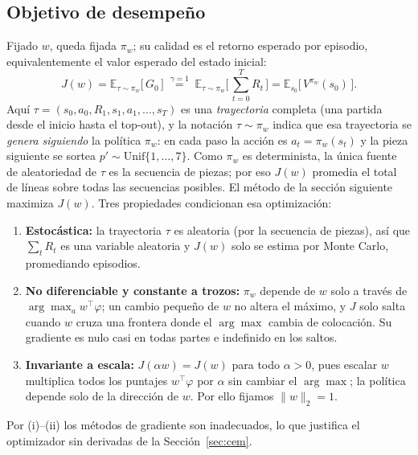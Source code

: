 \subsection{Objetivo de desempeño}
Fijado $w$, queda fijada $\pi_{w}$; su calidad es el retorno esperado por
episodio, equivalentemente el valor esperado del estado inicial:
\begin{equation}
    J(w) = \mathbb{E}_{\tau \sim \pi_{w}}\!\big[\, G_0 \,\big]
    \;\overset{\gamma = 1}{=}\; \mathbb{E}_{\tau \sim \pi_{w}}\!\Big[\, \sum_{t=0}^{T} R_{t} \,\Big]
    = \mathbb{E}_{s_0}\!\big[\, V^{\pi_{w}}(s_0) \,\big].
    \label{eq:objetivo}
\end{equation}
Aquí $\tau = (s_0, a_0, R_1, s_1, a_1, \dots, s_T)$ es una \emph{trayectoria}
completa (una partida desde el inicio hasta el top-out), y la notación
$\tau \sim \pi_{w}$ indica que esa trayectoria se \emph{genera siguiendo} la
política $\pi_{w}$: en cada paso la acción es $a_t = \pi_{w}(s_t)$ y la pieza
siguiente se sortea $p' \sim \mathrm{Unif}\{1, \dots, 7\}$. Como $\pi_{w}$ es
determinista, la única fuente de aleatoriedad de $\tau$ es la secuencia de piezas;
por eso $J(w)$ promedia el total de líneas sobre todas las secuencias posibles.
El método de la sección siguiente maximiza $J(w)$. Tres propiedades condicionan
esa optimización:
\begin{enumerate}[label=(\roman*), itemsep=2pt]
    \item \textbf{Estocástica:} la trayectoria $\tau$ es aleatoria (por la
          secuencia de piezas), así que $\sum_t R_t$ es una variable aleatoria y
          $J(w)$ solo se estima por Monte Carlo, promediando episodios.
    \item \textbf{No diferenciable y constante a trozos:} $\pi_{w}$ depende de $w$
          solo a través de $\arg\max_{a} w^{\top}\varphi$; un cambio pequeño de $w$
          no altera el máximo, y $J$ solo salta cuando $w$ cruza una frontera donde
          el $\arg\max$ cambia de colocación. Su gradiente es nulo casi en todas
          partes e indefinido en los saltos.
    \item \textbf{Invariante a escala:} $J(\alpha w) = J(w)$ para todo $\alpha > 0$,
          pues escalar $w$ multiplica todos los puntajes $w^{\top}\varphi$ por
          $\alpha$ sin cambiar el $\arg\max$; la política depende solo de la
          dirección de $w$. Por ello fijamos $\lVert w \rVert_{2} = 1$.
\end{enumerate}
Por (i)--(ii) los métodos de gradiente son inadecuados, lo que justifica el
optimizador sin derivadas de la Sección~\ref{sec:cem}.
